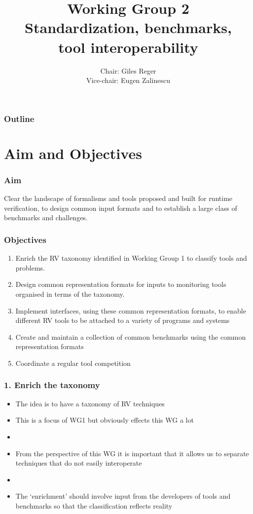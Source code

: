 \documentclass{beamer}
\title[WG2]{Working Group 2\\
{\bf Standardization, benchmarks, \\tool interoperability}}
\author{Chair: Giles Reger\\ Vice-chair: Eugen Zalinescu}
\begin{document}
\begin{frame}
  \titlepage
\end{frame}

\begin{frame}
  \frametitle{Outline}
  \tableofcontents  
\end{frame}

\section{Aim and Objectives}

\begin{frame}
\frametitle{Aim}
\Large
Clear the landscape of formalisms and tools proposed and built for runtime verification, to design common input formats and to establish a large class of benchmarks and challenges.
\end{frame}

\begin{frame}
\frametitle{Objectives}
\begin{enumerate}
	\item Enrich the RV taxonomy identified in Working Group 1 to classify tools and problems.
	\item Design common representation formats for inputs to monitoring tools organised in terms of the taxonomy.
	\item Implement interfaces, using these common representation formats, to enable different RV tools to be attached to a variety of programs and systems
	\item Create and maintain a collection of common benchmarks using the common representation formats
	\item Coordinate a regular tool competition 
\end{enumerate}
\end{frame}

\begin{frame}
\frametitle{1. Enrich the taxonomy}
\begin{itemize}
	\item The idea is to have a taxonomy of RV techniques
	\item This is a focus of WG1 but obviously effects this WG a lot
	\item[]
	\item From the perspective of this WG it is important that it allows us to separate techniques that do not easily interoperate
	\item[]
	\item The `enrichment' should involve input from the developers of tools and benchmarks so that the classification reflects reality
\end{itemize}
\end{frame}
\end{document}
